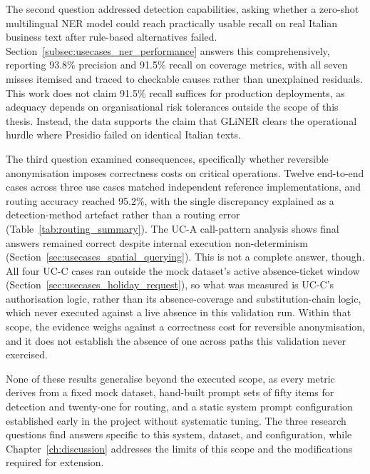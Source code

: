 The second question addressed detection capabilities, asking whether a zero-shot multilingual NER model could reach practically usable recall on real Italian business text after rule-based alternatives failed. Section~\ref{subsec:usecases_ner_performance} answers this comprehensively, reporting 93.8\% precision and 91.5\% recall on coverage metrics, with all seven misses itemised and traced to checkable causes rather than unexplained residuals. This work does not claim 91.5\% recall suffices for production deployments, as adequacy depends on organisational risk tolerances outside the scope of this thesis. Instead, the data supports the claim that GLiNER clears the operational hurdle where Presidio failed on identical Italian texts.

The third question examined consequences, specifically whether reversible anonymisation imposes correctness costs on critical operations. Twelve end-to-end cases across three use cases matched independent reference implementations, and routing accuracy reached 95.2\%, with the single discrepancy explained as a detection-method artefact rather than a routing error (Table~\ref{tab:routing_summary}). The UC-A call-pattern analysis shows final answers remained correct despite internal execution non-determinism (Section~\ref{sec:usecases_spatial_querying}). This is not a complete answer, though. All four UC-C cases ran outside the mock dataset's active absence-ticket window (Section~\ref{sec:usecases_holiday_request}), so what was measured is UC-C's authorisation logic, rather than its absence-coverage and substitution-chain logic, which never executed against a live absence in this validation run. Within that scope, the evidence weighs against a correctness cost for reversible anonymisation, and it does not establish the absence of one across paths this validation never exercised.

None of these results generalise beyond the executed scope, as every metric derives from a fixed mock dataset, hand-built prompt sets of fifty items for detection and twenty-one for routing, and a static system prompt configuration established early in the project without systematic tuning. The three research questions find answers specific to this system, dataset, and configuration, while Chapter~\ref{ch:discussion} addresses the limits of this scope and the modifications required for extension.

